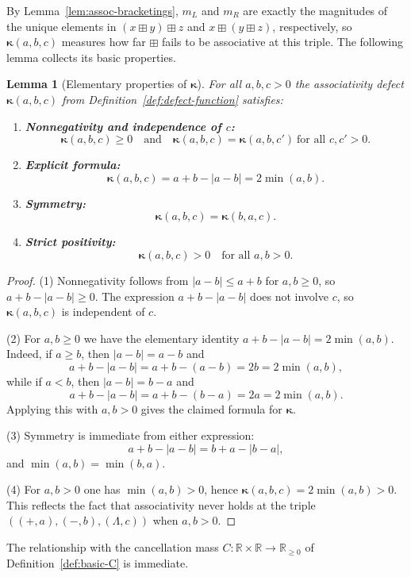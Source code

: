 \documentclass[11pt]{amsart}
\numberwithin{equation}{section}
\newtheorem{lemma}[theorem]{Lemma}
\theoremstyle{definition}
\theoremstyle{remark}
\newcommand{\R}{\mathbb{R}}
\newcommand{\AssocCurv}{\boldsymbol{\kappa}} %
\newcommand{\op}{\boxplus}                 %
\newcommand{\Cfun}{C}                      %
\begin{document}
By Lemma~\ref{lem:assoc-bracketings}, $m_L$ and $m_R$ are exactly the
magnitudes of the unique elements in $(x\op y)\op z$ and
$x\op(y\op z)$, respectively, so $\AssocCurv(a,b,c)$ measures how far $\op$
fails to be associative at this triple.  The following lemma collects
its basic properties.

\begin{lemma}[Elementary properties of $\AssocCurv$]
\label{lem:defect-basic-properties}
For all $a,b,c>0$ the associativity defect $\AssocCurv(a,b,c)$ from
Definition~\ref{def:defect-function} satisfies:
\begin{enumerate}
  \item \textbf{Nonnegativity and independence of $c$:}
  \[
    \AssocCurv(a,b,c) \ge 0
    \quad\text{and}\quad
    \AssocCurv(a,b,c) = \AssocCurv(a,b,c')
    \ \text{for all }c,c'>0.
  \]
  \item \textbf{Explicit formula:}
  \[
    \AssocCurv(a,b,c) = a+b-|a-b| = 2\min(a,b).
  \]
  \item \textbf{Symmetry:}
  \[
    \AssocCurv(a,b,c) = \AssocCurv(b,a,c).
  \]
  \item \textbf{Strict positivity:}
  \[
    \AssocCurv(a,b,c) > 0
    \quad\text{for all }a,b>0.
  \]
\end{enumerate}
\end{lemma}

\begin{proof}
(1) Nonnegativity follows from $|a-b|\le a+b$ for $a,b\ge0$, so
$a+b-|a-b|\ge0$.  The expression $a+b-|a-b|$ does not involve $c$, so
$\AssocCurv(a,b,c)$ is independent of $c$.

(2) For $a,b\ge0$ we have the elementary identity
$a+b-|a-b|=2\min(a,b)$.  Indeed, if $a\ge b$, then $|a-b|=a-b$ and
\[
  a+b-|a-b|
  = a+b-(a-b)
  = 2b
  = 2\min(a,b),
\]
while if $a<b$, then $|a-b|=b-a$ and
\[
  a+b-|a-b|
  = a+b-(b-a)
  = 2a
  = 2\min(a,b).
\]
Applying this with $a,b>0$ gives the claimed formula for $\AssocCurv$.

(3) Symmetry is immediate from either expression:
\[
  a+b-|a-b| = b+a-|b-a|,
\]
and $\min(a,b)=\min(b,a)$.

(4) For $a,b>0$ one has $\min(a,b)>0$, hence
$\AssocCurv(a,b,c)=2\min(a,b)>0$.  This reflects the fact that associativity
never holds at the triple $((+,a),(-,b),(\Lambda,c))$ when $a,b>0$.
\end{proof}

The relationship with the cancellation mass
$\Cfun:\R\times\R\to\R_{\ge0}$ of Definition~\ref{def:basic-C} is
immediate.
\end{document}
